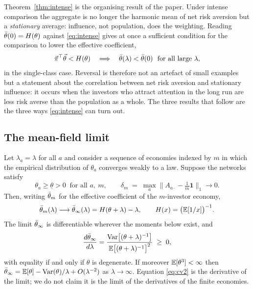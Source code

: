 Theorem~\ref{thm:intense} is the organising result of the paper. Under intense
comparison the aggregate is no longer the harmonic mean of net risk aversion
but a \emph{stationary} average: influence, not population, does the weighting.
Reading $\bar\theta(0)=H(\theta)$ against \eqref{eq:intense} gives at once a
sufficient condition for the comparison to lower the effective coefficient,
%
\begin{equation}
\vec\pi^{\top}\vec\theta<H(\theta)
\quad\Longrightarrow\quad
\bar\theta(\lambda)<\bar\theta(0)\ \text{ for all large }\lambda ,
\label{eq:revcond}
\end{equation}
%
in the single-class case. Reversal is therefore not an artefact of small
examples but a statement about the correlation between net risk aversion and
stationary influence: it occurs when the investors who attract attention in the
long run are less risk averse than the population as a whole. The three results
that follow are the three ways \eqref{eq:intense} can turn out.

\subsection{The mean-field limit}

\begin{proposition}
\label{prop:mf}
Let $\lambda_a=\lambda$ for all $a$ and consider a sequence of economies
indexed by $m$ in which the empirical distribution of $\theta_a$ converges
weakly to a law. Suppose the networks satisfy
%
\begin{equation}
\theta_a\geq\underline\theta>0\ \text{ for all }a,\ m,
\qquad
\delta_m\;=\;\max_a\Big\|A_{a\cdot}-\tfrac1m\mathbf 1\Big\|_1\longrightarrow0 .
\label{eq:primitive}
\end{equation}
%
Then, writing $\bar\theta_m$ for the effective
coefficient of the $m$-investor economy,
%
\begin{equation}
\bar\theta_m(\lambda)\longrightarrow \bar\theta_\infty(\lambda)=H(\theta+\lambda)-\lambda,
\qquad H(x)=\big(\mathbb{E}[1/x]\big)^{-1} .
\label{eq:mf}
\end{equation}
%
The limit $\bar\theta_\infty$ is differentiable wherever the moments below exist,
and
%
\begin{equation}
\frac{d\bar\theta_\infty}{d\lambda}
=\frac{\mathrm{Var}\big[(\theta+\lambda)^{-1}\big]}
{\mathbb{E}\big[(\theta+\lambda)^{-1}\big]^{2}}\;\geq\;0 ,
\label{eq:cv2}
\end{equation}
%
with equality if and only if $\theta$ is degenerate. If moreover
$\mathbb{E}[\theta^3]<\infty$ then
$\bar\theta_\infty=\mathbb{E}[\theta]-\mathrm{Var}(\theta)/\lambda+O(\lambda^{-2})$ as
$\lambda\to\infty$. Equation \eqref{eq:cv2} is the derivative of the limit;
we do not claim it is the limit of the derivatives of the finite economies.
\end{proposition}

